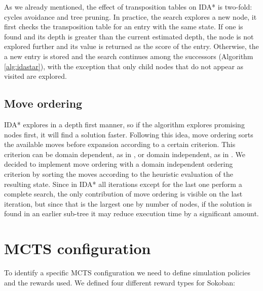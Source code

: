 \medskip\noindent
As we already mentioned, the effect of transposition tables on IDA* is two-fold: cycles avoidance and tree pruning.
In practice, the search explores a new node, it first checks the transposition table for an entry with the same state. If one is found and its depth is greater than the current estimated depth, the node is not explored further and its value is returned as the score of the entry. Otherwise, the a new entry is stored and the search continues among the successors (Algorithm \ref{alg:idastar}), with the exception that only child nodes that do not appear as visited are explored.

\subsection{Move ordering}
IDA* explores in a depth first manner, so if the algorithm explores promising nodes first, it will find a solution faster. Following this idea, move ordering sorts the available moves before expansion according to a certain criterion. This criterion can be domain dependent, as in \cite{Junghanns99pushingthe}, or domain independent, as in \cite{DBLP:journals/pami/ReinefeldM94}. We decided to implement move ordering with a domain independent ordering criterion by sorting the moves according to the heuristic evaluation of the resulting state.
\medskip\noindent
Since in IDA* all iterations except for the last one perform a complete search, the only contribution of move ordering is visible on the last iteration, but since that is the largest one by number of nodes, if the solution is found in an earlier sub-tree it may reduce execution time by a significant amount.

\section{MCTS configuration}\label{rewardtype}
To identify a specific MCTS configuration we need to define simulation policies and the rewards used. We defined four different reward types for Sokoban:

